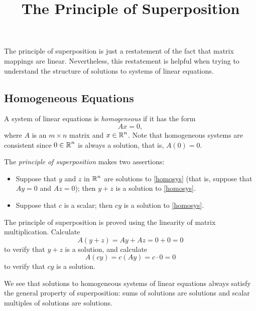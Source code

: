 \documentclass{ximera}
\title{The Principle of Superposition}
\begin{document}
\begin{abstract}
\end{abstract}
\maketitle


\label{S:Superposition}

The principle of superposition is just a restatement of the fact
that matrix mappings are linear.  Nevertheless, this restatement
is helpful when trying to understand the structure of solutions
to systems of linear equations.

\subsection*{Homogeneous Equations}

A system of linear equations is {\em homogeneous\/} if it has
the form
\begin{equation} \label{homosys}
Ax=0,
\end{equation}
where $A$ is an $m\times n$ matrix and $x\in\mbox{$\Bbb{R}$}^n$.  Note that
homogeneous systems are consistent since $0\in\mbox{$\Bbb{R}$}^n$ is always a
solution, that is, $A(0)=0$.

The {\em principle of superposition\/}   makes two assertions:
\begin{itemize}
\item  Suppose that $y$ and $z$ in $\mbox{$\Bbb{R}$}^n$ are solutions to \eqref{homosys}
(that is, suppose that $Ay=0$ and $Az=0$); then $y+z$ is a solution
to \eqref{homosys}.
\item Suppose that $c$ is a scalar; then $cy$ is a solution to
\eqref{homosys}.
\end{itemize}
The principle of superposition is proved using the linearity of matrix 
multiplication.  Calculate
\[
A(y+z) = Ay + Az = 0+0=0
\]
to verify that $y+z$ is a solution, and calculate
\[
A(cy) = c(Ay) = c\cdot 0 = 0
\]
to verify that $cy$ is a solution.

We see that solutions to homogeneous systems of linear equations
always satisfy the general property of superposition: sums of
solutions are solutions and scalar multiples of solutions are
solutions.
\end{document}

